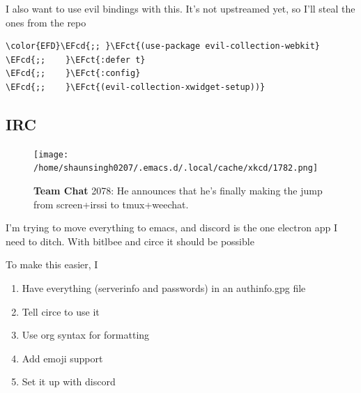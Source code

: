 \documentclass{scrartcl}
\newcommand{\EFct}[1]{\textcolor{EFct}{#1}} %
\newcommand{\EFcd}[1]{\textcolor{EFcd}{#1}} %
\begin{document}
I also want to use evil bindings with this. It's not upstreamed yet, so I'll steal the ones from the repo
\begin{Code}
\begin{Verbatim}[]
\color{EFD}\EFcd{;; }\EFct{(use-package evil-collection-webkit}
\EFcd{;;    }\EFct{:defer t}
\EFcd{;;    }\EFct{:config}
\EFcd{;;    }\EFct{(evil-collection-xwidget-setup))}
\end{Verbatim}
\end{Code}

\subsection{IRC}
\label{sec:org85c6d1e}
\begin{figure}[!htb]
	  \centering
	  \texttt{[image: /home/shaunsingh0207/.emacs.d/.local/cache/xkcd/1782.png]}
  \caption*{\label{xkcd:1782} \textbf{Team Chat} 2078: He announces that he's finally making the jump from screen+irssi to tmux+weechat.}
	\end{figure}

I'm trying to move everything to emacs, and discord is the one electron app I
need to ditch. With bitlbee and circe it should be possible

To make this easier, I

\begin{enumerate}
\item Have everything (serverinfo and passwords) in an authinfo.gpg file
\item Tell circe to use it
\item Use org syntax for formatting
\item Add emoji support
\item Set it up with discord
\end{enumerate}
\end{document}

